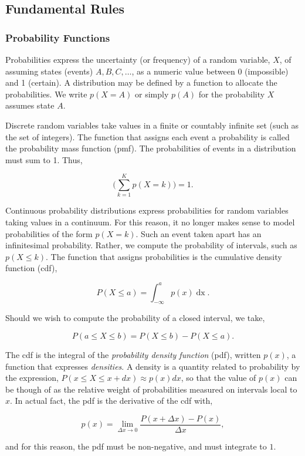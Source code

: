 \documentclass[11pt]{amsart}
\begin{document}
\subsection{Fundamental Rules}

\subsubsection{Probability Functions}

Probabilities express the uncertainty (or frequency) of a random variable, $X$, of assuming states (events) $A, B, C, \dots$, as a numeric value between 0 (impossible) and 1 (certain). A distribution may be defined by a function to allocate the probabilities. We write $p(X=A)$ or simply $p(A)$ for the probability $X$ assumes state $A$.

Discrete random variables take values in a finite or countably infinite set (such as the set of integers). The function that assigns each event a probability is called the probability mass function (pmf). The probabilities of events in a distribution must sum to 1. Thus,

$$\Bigg(\sum_{k = 1}^{K} p(X = k)\Bigg) = 1.$$

Continuous probability distributions express probabilities for random variables taking values in a continuum. For this reason, it no longer makes sense to model probabilities of the form $p(X = k)$. Such an event taken apart has an infinitesimal probability. Rather, we compute the probability of intervals, such as $p(X \leq k)$. The function that assigns probabilities is the cumulative density function (cdf),

$$
P(X \leq a) = \int_{-\infty}^{a} p(x) \mathop{dx}.
$$

Should we wish to compute the probability of a closed interval, we take,

$$P(a \leq X \leq b) = P(X \leq b) - P(X \leq a).$$

The cdf is the integral of the \emph{probability density function} (pdf), written $p(x)$, a function that expresses \emph{densities}. A density is a quantity related to probability by the expression, $P(x \leq X \leq x+dx) \approx p(x)dx$, so that the value of $p(x)$ can be though of as the relative weight of probabilities measured on intervals local to $x$. In actual fact, the pdf is the derivative of the cdf with,

$$p(x) = \lim_{\Delta x \to 0} \frac{P(x + \Delta x) - P(x)}{\Delta x},$$

and for this reason, the pdf must be non-negative, and must integrate to $1$.
\end{document}

